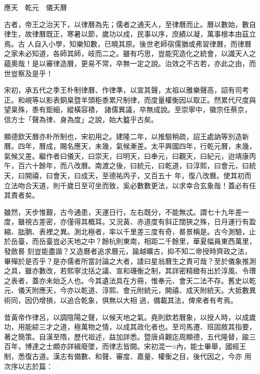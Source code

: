 
\begin{pinyinscope}

 應天　乾元　儀天曆



 古者，帝王之治天下，以律曆為先；儒者之通天人，至律曆而止。曆以數始，數自律生，故律曆既正，寒暑以節，歲功以成，民事以序，庶績以凝，萬事根本由茲立焉。古
 人自入小學，知樂知數，已曉其原。後世老師宿儒猶或弗習律曆，而律曆之家未必知道，各師其師，岐而二之。雖有巧思，豈能究造化之統會，以識天人之蘊奧哉！是以審律造曆，更易不常，卒無一定之說。治效之不古若，亦此之由，而世豈察及是乎！



 宋初，承五代之季王朴制律曆、作律準，以宣其聲，太祖以雅樂聲高，詔有司考正。和峴等以影表銅臬暨羊頭秬黍累尺制律，而度量權衡因以取正。然累代尺度與望臬殊，黍有鉅細，縱橫容積，
 諸儒異議，卒無成說。至崇寧中，徽宗任蔡京，信方士「聲為律、身為度」之說，始大盭乎古矣。



 顯德欽天曆亦朴所制也，宋初用之。建隆二年，以推驗稍疏，詔王處訥等別造新曆。四年，曆成，賜名應天，未幾，氣候漸差。太平興國四年，行乾元曆，未幾，氣候又差。繼作者曰儀天，曰崇天，曰明天，曰奉元，曰觀天，曰紀元，迨靖康丙午，百六十餘年，而八改曆。南渡之後，曰統元，曰乾道，曰淳熙，曰會元，曰統天，曰開禧，曰會天，曰成天，至德祐丙子，又百五十
 年，復八改曆。使其初而立法吻合天道，則千歲日至可坐而致，奚必數數更法，以求幸合玄象哉！蓋必有任其責者矣。



 雖然，天步惟艱，古今通患，天運日行，左右既分，不能無忒。謂七十九年差一度，雖視古差密，亦僅得其概耳。又況黃、赤道度有斜正闊狹之殊，日月運行有盈縮、朏朒、表裡之異。測北極者，率以千里差三度有奇，晷景稱是。古今測驗，止於岳臺，而岳臺豈必天地之中？餘杭則東南，相距二千餘里，華夏幅員東西萬里，發斂晷
 刻豈能盡諧？又造曆者追求曆元，踰越曠古，抑不知二帝授時齊政之法，畢殫於是否乎？是亦儒者所當討論之大者，諉曰星翁曆生之責可哉？至於儀象推測之具，雖亦數改，若熙寧沈括之議、宣和璣衡之制，其詳密精緻有出於淳風、令瓚之表者，蓋亦未始乏人也。今其遺法具在方冊，惟奉元、會天二法不存。舊史以乾元、儀天附應天，今亦以乾道、淳熙、會元附統元，開禧、成天附統天。大抵數異術同，因仍增損，以追合乾象，俱無以大相
 過，備載其法，俾來者有考焉。



 昔黃帝作律呂，以調陰陽之聲，以候天地之氣。堯則欽若曆象，以授人時，以成歲功，用能綜三才之道，極萬物之情，以成其政化者也。至司馬遷、班固敘其指要，著之簡策。自漢至隋，歷代祖述，益加詳悉。暨唐貞觀迄周顯德，五代隆替，踰三百年，博達之士頗亦詳緝廢墜，而律志皆闕。宋初混一○內，能士畢舉，國經王制，悉復古道。漢志有備數、和聲、審度、嘉量、權衡之目，後代因之，今亦
 用次序以志於篇：




\end{pinyinscope}
